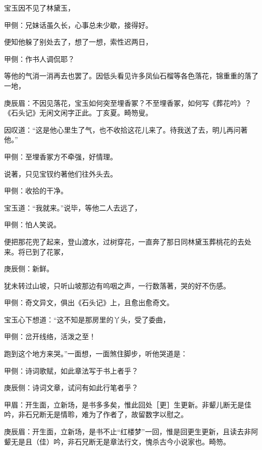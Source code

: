 \begin{parag}
    宝玉因不见了林黛玉，\begin{note}甲侧：兄妹话虽久长，心事总未少歇，接得好。\end{note}便知他躲了别处去了，想了一想，索性迟两日，\begin{note}甲侧：作书人调侃耶？\end{note}等他的气消一消再去也罢了。因低头看见许多凤仙石榴等各色落花，锦重重的落了一地，\begin{note}庚辰眉：不因见落花，宝玉如何突至埋香冢？不至埋香冢，如何写《葬花吟》？《石头记》无闲文闲字正此。丁亥夏。畸笏叟。\end{note}因叹道：“这是他心里生了气，也不收拾这花儿来了。待我送了去，明儿再问著他。”\begin{note}甲侧：至埋香冢方不牵强，好情理。\end{note}说著，只见宝钗约著他们往外头去。\begin{note}甲侧：收拾的干净。\end{note}宝玉道：“我就来。”说毕，等他二人去远了，\begin{note}甲侧：怕人笑说。\end{note}便把那花兜了起来，登山渡水，过树穿花，一直奔了那日同林黛玉葬桃花的去处来。将已到了花冢，\begin{note}庚辰侧：新鲜。\end{note}犹未转过山坡，只听山坡那边有呜咽之声，一行数落著，哭的好不伤感。\begin{note}甲侧：奇文异文，俱出《石头记》上，且愈出愈奇文。\end{note}宝玉心下想道：“这不知是那房里的丫头，受了委曲，\begin{note}甲侧：岔开线络，活泼之至！\end{note}跑到这个地方来哭。”一面想，一面煞住脚步，听他哭道是：\begin{note}甲侧：诗词歌赋，如此章法写于书上者乎？\end{note}\begin{note}庚辰侧：诗词文章，试问有如此行笔者乎？\end{note}\begin{note}甲眉：开生面，立新场，是书多多矣，惟此回处［更］生更新。非颦儿断无是佳吟，非石兄断无是情聆，难为了作者了，故留数字以慰之。\end{note}\begin{note}庚辰眉：开生面，立新场，是书不止“红楼梦”一回，惟是回更生更新，且读去非阿颦无是且（佳）吟，非石兄断无是章法行文，愧杀古今小说家也。畸笏。\end{note}
\end{parag}


